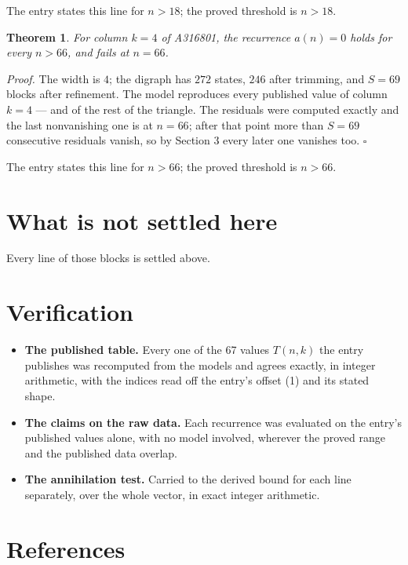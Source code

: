 \documentclass[11pt]{article}
\newtheorem{theorem}{Theorem}
\theoremstyle{definition}
\begin{document}
The entry states this line for $n > 18$; the proved threshold is $n > 18$.

\begin{theorem} For column $k = 4$ of A316801, the recurrence $a(n) = 0$ holds for every $n > 66$, and fails at $n = 66$.\end{theorem}

{\itshape Proof.} The width is $4$; the digraph has $272$ states, $246$ after trimming, and $S = 69$ blocks after refinement. The model reproduces every published value of column $k = 4$ --- and of the rest of the triangle. The residuals were computed exactly and the last nonvanishing one is at $n = 66$; after that point more than $S = 69$ consecutive residuals vanish, so by Section 3 every later one vanishes too. $\square$

The entry states this line for $n > 66$; the proved threshold is $n > 66$.

\section{What is not settled here}

Every line of those blocks is settled above.

\section{Verification}

\begin{itemize}

\item {\bfseries The published table.} Every one of the 67 values $T(n,k)$ the entry publishes was recomputed from the models and agrees exactly, in integer arithmetic, with the indices read off the entry's offset (1) and its stated shape.

\item {\bfseries The claims on the raw data.} Each recurrence was evaluated on the entry's published values alone, with no model involved, wherever the proved range and the published data overlap.

\item {\bfseries The annihilation test.} Carried to the derived bound for each line separately, over the whole vector, in exact integer arithmetic.

\end{itemize}

\section{References}
\end{document}
